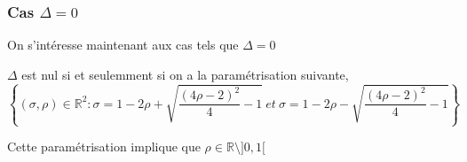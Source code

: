 \documentclass{article}
\newcommand{\R}{\mathbb{R}}
\newtheorem[M , nocut]{prop}{Proposition}[section]
\newtheorem[M]{propt}{Propriété}[section]
\newtheorem[L , nocut]{thm}{Théoreme}
\newtheorem[L]{cor}{Corollaire}
\begin{document}
\subsubsection*{Cas $\Delta = 0$}
On s'intéresse maintenant aux cas tels que $\Delta=0$

\begin{prop} 
    \label{prop:Deg0}
    $\Delta$ est nul si et seulemment si on a la paramétrisation suivante,
    \[
        \left\{(\sigma,\rho)\in \R ^2 :\sigma = 1-2 \rho + \sqrt{ \frac{(4\rho-2)^2}{4} -1 }\ et\ \sigma = 1-2 \rho - \sqrt{ \frac{(4\rho-2)^2}{4} -1 } \right\}  
    \]
\end{prop}

\begin{example}[Remarque]
    Cette paramétrisation implique que $\rho \in \R \setminus ]0,1[$ 
\end{example}
\end{document}
